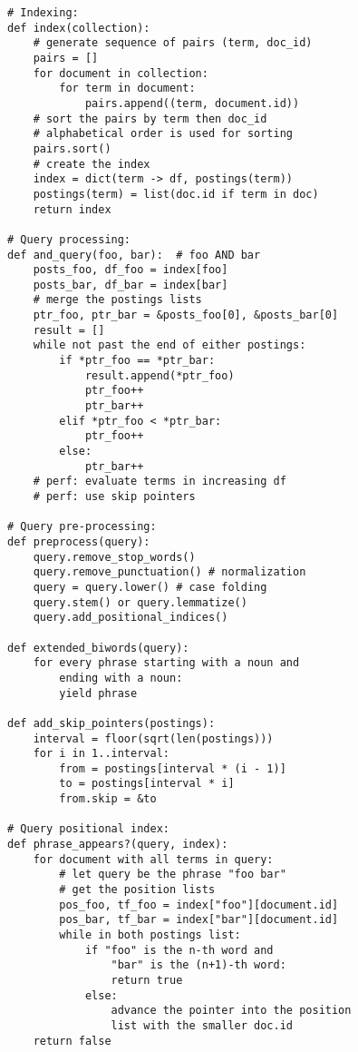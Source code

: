 \begin{lstlisting}
# Indexing:
def index(collection):
    # generate sequence of pairs (term, doc_id)
    pairs = []
    for document in collection:
        for term in document:
            pairs.append((term, document.id))
    # sort the pairs by term then doc_id
    # alphabetical order is used for sorting
    pairs.sort()
    # create the index
    index = dict(term -> df, postings(term))
    postings(term) = list(doc.id if term in doc)
    return index

# Query processing:
def and_query(foo, bar):  # foo AND bar
    posts_foo, df_foo = index[foo]
    posts_bar, df_bar = index[bar]
    # merge the postings lists
    ptr_foo, ptr_bar = &posts_foo[0], &posts_bar[0]
    result = []
    while not past the end of either postings:
        if *ptr_foo == *ptr_bar:
            result.append(*ptr_foo)
            ptr_foo++
            ptr_bar++
        elif *ptr_foo < *ptr_bar:
            ptr_foo++
        else:
            ptr_bar++
    # perf: evaluate terms in increasing df
    # perf: use skip pointers

# Query pre-processing:
def preprocess(query):
    query.remove_stop_words()
    query.remove_punctuation() # normalization
    query = query.lower() # case folding
    query.stem() or query.lemmatize()
    query.add_positional_indices()

def extended_biwords(query):
    for every phrase starting with a noun and
        ending with a noun:
        yield phrase

def add_skip_pointers(postings):
    interval = floor(sqrt(len(postings)))
    for i in 1..interval:
        from = postings[interval * (i - 1)]
        to = postings[interval * i]
        from.skip = &to

# Query positional index:
def phrase_appears?(query, index):
    for document with all terms in query:
        # let query be the phrase "foo bar"
        # get the position lists
        pos_foo, tf_foo = index["foo"][document.id]
        pos_bar, tf_bar = index["bar"][document.id]
        while in both postings list:
            if "foo" is the n-th word and
                "bar" is the (n+1)-th word:
                return true
            else:
                advance the pointer into the position
                list with the smaller doc.id
    return false
\end{lstlisting}

